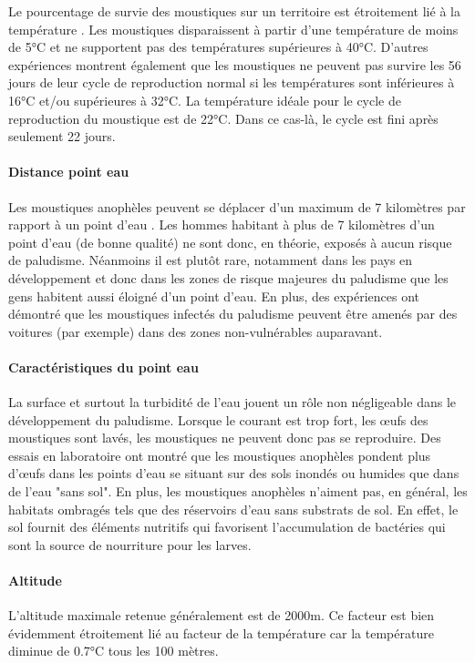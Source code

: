 Le pourcentage de survie des moustiques sur un territoire est étroitement lié à la température \citep{Ermert2011}. Les moustiques disparaissent à partir d'une température de moins de 5°C et ne supportent pas des températures supérieures à 40°C. D'autres expériences montrent également que les moustiques ne peuvent pas survire les 56 jours de leur cycle de reproduction normal si les températures sont inférieures à 16°C et/ou supérieures à 32°C. La température idéale pour le cycle de reproduction du moustique est de 22°C. Dans ce cas-là, le cycle est fini après seulement 22 jours. \citep{Adjuik1998}

\paragraph{Distance point eau} 

Les moustiques anophèles peuvent se déplacer d'un maximum de 7 kilomètres par rapport à un point d'eau \citep{Ermert2011}. Les hommes habitant à plus de 7 kilomètres d'un point d'eau (de bonne qualité) ne sont donc, en théorie, exposés à aucun risque de paludisme. Néanmoins il est plutôt rare, notamment dans les pays en développement et donc dans les zones de risque majeures du paludisme que les gens habitent aussi éloigné d'un point d'eau. En plus, des expériences ont démontré que les moustiques infectés du paludisme peuvent être amenés par des voitures (par exemple) dans des zones non-vulnérables auparavant.

\paragraph{Caractéristiques du point eau} \label{caracteaux}
La surface et surtout la turbidité de l'eau jouent un rôle non négligeable dans le développement du paludisme. Lorsque le courant est trop fort, les œufs des moustiques sont lavés, les moustiques ne peuvent donc pas se reproduire. 
Des essais en laboratoire \citep{Minakawa1999} ont montré que les moustiques anophèles pondent plus d'œufs dans les points d'eau se situant sur des sols inondés ou humides que dans de l'eau "sans sol". En plus, les moustiques anophèles n'aiment pas, en général, les habitats ombragés tels que des réservoirs d'eau sans substrats de sol. En effet, le sol fournit des éléments nutritifs qui favorisent l'accumulation de bactéries qui sont la source de nourriture pour les larves.

\paragraph{Altitude}
L'altitude maximale retenue généralement est de 2000m. Ce facteur est bien évidemment étroitement lié au facteur de la température car la température diminue de 0.7°C tous les 100 mètres.

